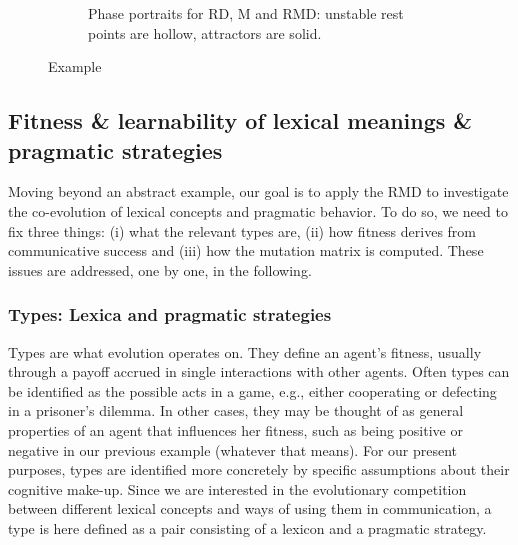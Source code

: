 \documentclass[a4paper, 11pt]{article}
\theoremstyle{Satz}
\begin{document}
\begin{figure}[t]
\begin{subfigure}[b]{0.5\textwidth}
        


    \caption{Phase portraits for RD, M and RMD: unstable rest points are hollow, attractors are
      solid.}
        \label{fig:Phase_RD}
    \end{subfigure}

  \caption{Example}
  \label{fig:Example_RMD}
\end{figure}


\subsection{Fitness \& learnability of lexical meanings \& pragmatic strategies}
\label{sec:fitn--learn}

Moving beyond an abstract example, our goal is to apply the RMD to investigate the co-evolution
of lexical concepts and pragmatic behavior. To do so, we need to fix three things: (i) what the
relevant types are, (ii) how fitness derives from communicative success and (iii) how the
mutation matrix is computed. These issues are addressed, one by one, in the following.

\subsubsection{Types: Lexica and pragmatic strategies}
\label{sec:languages+use}

Types are what evolution operates on. They define an agent's fitness, usually through a payoff
accrued in single interactions with other agents. Often types can be identified as the possible
acts in a game, e.g., either cooperating or defecting in a prisoner's dilemma. In other cases,
they may be thought of as general properties of an agent that influences her fitness, such as
being positive or negative in our previous example (whatever that means). For our present
purposes, types are identified more concretely by specific assumptions about their cognitive
make-up. Since we are interested in the evolutionary competition between different lexical
concepts and ways of using them in communication, a type is here defined as a pair consisting
of a lexicon and a pragmatic strategy.
\end{document}

